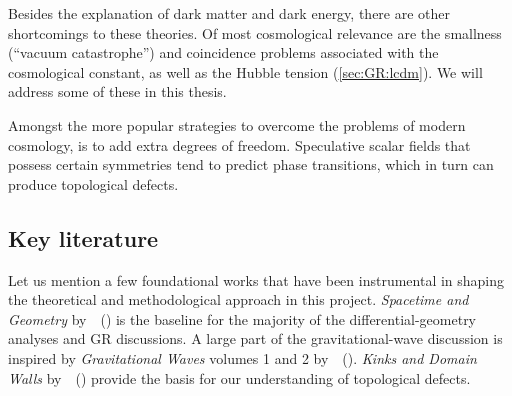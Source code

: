 Besides the explanation of dark matter and dark energy, there are other shortcomings to these theories. %
Of most cosmological relevance are the smallness (``vacuum catastrophe'') and coincidence problems associated with the cosmological constant, as well as the Hubble tension (\cref{sec:GR:lcdm}). We will address some of these in this thesis. 


 
Amongst the more popular strategies to overcome the problems of modern cosmology, is to add extra degrees of freedom. Speculative scalar fields that possess certain symmetries tend to predict phase transitions, which in turn can produce topological defects. 






%







\subsection{Key literature}
    Let us mention a few foundational works that have been instrumental in shaping the theoretical and methodological approach in this project. %
    \textit{Spacetime and Geometry} by~\citeauthor{carrollSpacetimeGeometryIntroduction2019}~(\citeyear{carrollSpacetimeGeometryIntroduction2019}) is the baseline for the majority of the differential-geometry analyses and GR discussions. A large part of the gravitational-wave discussion is inspired by \textit{Gravitational Waves} volumes 1 and 2 by~\citeauthor{maggioreGravitationalWavesVol2007}~(\citeyear{maggioreGravitationalWavesVol2007,maggioreGravitationalWavesVol2018}). \textit{Kinks and Domain Walls} by~\citeauthor{vachaspatiKinksDomainWalls2006}~(\citeyear{vachaspatiKinksDomainWalls2006}) provide the basis for our understanding of topological defects.





